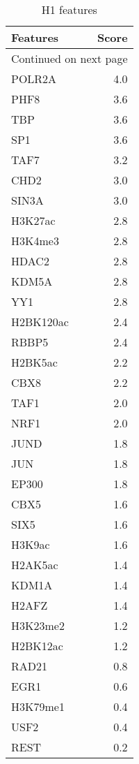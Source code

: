 \begin{longtable}{lr}
\caption{H1 features}\\
\toprule
  Features &  Score \\
\midrule
\endhead
\midrule
\multicolumn{2}{r}{{Continued on next page}} \\
\midrule
\endfoot

\bottomrule
\endlastfoot
    POLR2A &    4.0 \\
      PHF8 &    3.6 \\
       TBP &    3.6 \\
       SP1 &    3.6 \\
      TAF7 &    3.2 \\
      CHD2 &    3.0 \\
     SIN3A &    3.0 \\
   H3K27ac &    2.8 \\
   H3K4me3 &    2.8 \\
     HDAC2 &    2.8 \\
     KDM5A &    2.8 \\
       YY1 &    2.8 \\
 H2BK120ac &    2.4 \\
     RBBP5 &    2.4 \\
   H2BK5ac &    2.2 \\
      CBX8 &    2.2 \\
      TAF1 &    2.0 \\
      NRF1 &    2.0 \\
      JUND &    1.8 \\
       JUN &    1.8 \\
     EP300 &    1.8 \\
      CBX5 &    1.6 \\
      SIX5 &    1.6 \\
    H3K9ac &    1.6 \\
   H2AK5ac &    1.4 \\
     KDM1A &    1.4 \\
     H2AFZ &    1.4 \\
  H3K23me2 &    1.2 \\
  H2BK12ac &    1.2 \\
     RAD21 &    0.8 \\
      EGR1 &    0.6 \\
  H3K79me1 &    0.4 \\
      USF2 &    0.4 \\
      REST &    0.2 \\
\end{longtable}
